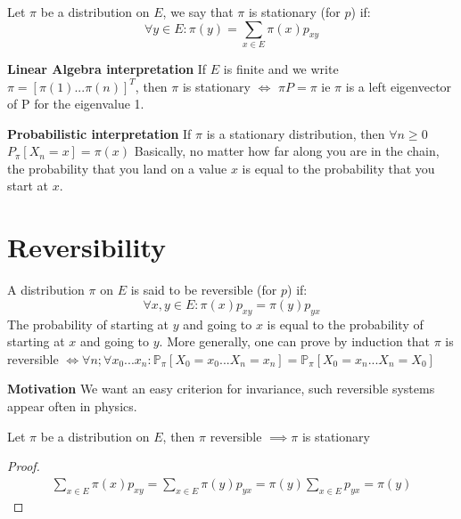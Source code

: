 \begin{defn}
	Let $\pi$ be a distribution on $E$, we say that $\pi$ is stationary (for $p$) if:
\begin{equation}
	\forall y \in E: \pi(y) = \sum_{x \in E} \pi(x)p_{xy}
\end{equation}

\textbf{Linear Algebra interpretation} If $E$ is finite and we write  $\pi = [\pi(1)...\pi(n)]^T$, then $\pi$ is stationary $ \iff$ $\pi P = \pi$ ie $\pi$ is a left eigenvector of P for the eigenvalue 1.

\textbf{Probabilistic interpretation} If $\pi $ is a stationary distribution, then $\forall n \geq 0$ $P_{\pi }[X_n =x] = \pi (x)$
\newline \indent
Basically, no matter how far along you are in the chain, the probability that you land on a value $x$ is equal to the probability that you start at $x$.
\end{defn}

\section{Reversibility}
\begin{defn}
	A distribution $\pi $ on $ E$ is said to be reversible (for $p$) if:
\begin{equation}
	\forall x,y \in E: \pi (x) p_{xy}= \pi (y)p_{yx}
\end{equation}
The probability of starting at $y$ and going to $x$ is equal to the probability of starting at $x$ and going to $y$. More generally, one can prove by induction that $\pi $ is reversible $ \iff \forall n; \forall x_0...x_n: \mathbb{P}_{\pi } \left[ X_0=x_0...X_n=x_n \right] = \mathbb{P}_{\pi } \left[ X_0=x_n...X_n=X_0 \right] $
\end{defn}

\textbf{Motivation} We want an easy criterion for invariance, such reversible systems appear often in physics.

\begin{prop}[]
	Let $\pi $ be a distribution on $E$, then $\pi $ reversible $\implies \pi $ is stationary
\end{prop}
\begin{proof}
	\begin{gather}
		\sum_{x \in E}^{} \pi (x)p_{xy} = \sum_{x \in E}^{} \pi (y) p_{yx} = \pi (y) \sum_{x \in E}^{} p_{yx} = \pi(y) 
	\end{gather}
	
\end{proof}

